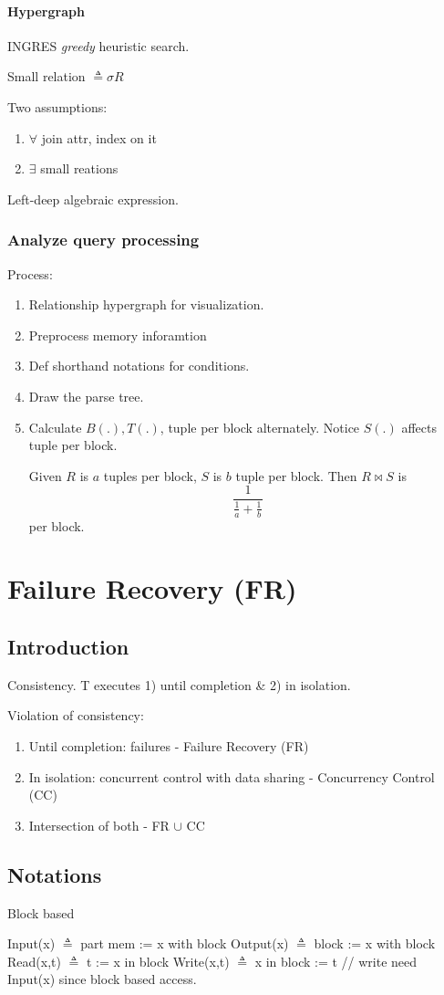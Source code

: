 \documentclass[a4paper]{report}
\begin{document}
\subsubsection{Hypergraph}
INGRES \textit{greedy} heuristic search.

Small relation $\triangleq \sigma R$

Two assumptions:
\begin{enumerate}
\item $\forall$ join attr, index on it
\item $\exists$  small reations
\end{enumerate}
Left-deep algebraic expression.
\subsection{Analyze query processing}
Process:
\begin{enumerate}
\item Relationship hypergraph for visualization.
\item Preprocess memory inforamtion
\item Def shorthand notations for conditions.
\item Draw the parse tree.
\item Calculate $B(.), T(.)$, tuple per block alternately. Notice $S(.)$ affects tuple per block.

Given $R$ is $a$ tuples per block, $S$ is $b$ tuple per block. Then $R\bowtie S$ is $$
\frac{1}{\frac{1}{a}+\frac{1}{b}}
$$
per block.
\end{enumerate}
\chapter{Failure Recovery (FR)}
\section*{Introduction}
Consistency. T executes 1) until completion \& 2) in isolation.

Violation of consistency:
\begin{enumerate}
\item Until completion: failures - Failure Recovery (FR)
\item In isolation: concurrent control with data sharing - Concurrency Control
(CC)
\item Intersection of both - FR $\cup$ CC
\end{enumerate}

\section{Notations}
Block based
\begin{enumerate}
\treeitem Input(x) $\triangleq$ part mem := x with block
\treeitem Output(x) $\triangleq$ block := x with block
\treeitem Read(x,t) $\triangleq$ t := x in block
\treeitem Write(x,t) $\triangleq$ x in block := t // write need Input(x) since block based access.
\end{enumerate}
\end{document}
